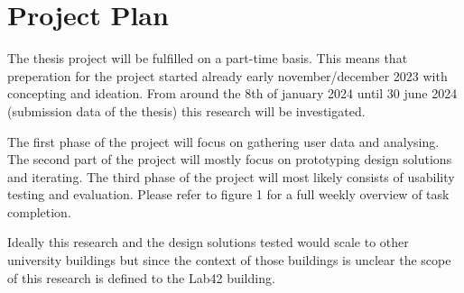 \section{Project Plan}

The thesis project will be fulfilled on a part-time basis. This means that preperation for the project started already early november/december 2023 with concepting and ideation. From around the 8th of january 2024 until 30 june 2024 (submission data of the thesis) this research will be investigated.

The first phase of the project will focus on gathering user data and analysing. The second part of the project will mostly focus on prototyping design solutions and iterating. The third phase of the project will most likely consists of usability testing and evaluation. Please refer to figure 1 for a full weekly overview of task completion.

Ideally this research and the design solutions tested would scale to other university buildings but since the context of those buildings is unclear the scope of this research is defined to the Lab42 building.

